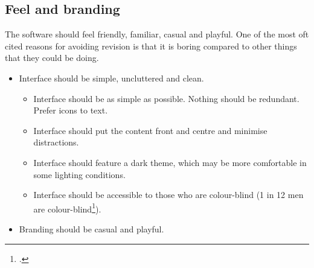 \documentclass{report}
\begin{document}
\subsection{Feel and branding}
The software should feel friendly, familiar, casual and playful. One of the most oft cited reasons for avoiding revision is that it is boring compared to other things that they could be doing.
\begin{itemize}
  \item Interface should be simple, uncluttered and clean.
  \begin{itemize}
    \item Interface should be as simple as possible. Nothing should be redundant. Prefer icons to text.
    \item Interface should put the content front and centre and minimise distractions.
    \item Interface should feature a dark theme, which may be more comfortable in some lighting conditions.
    \item Interface should be accessible to those who are colour-blind (1 in 12 men are colour-blind\footcite{Colourblindness}).
  \end{itemize}
  \item Branding should be casual and playful.
\end{itemize}
\end{document}
